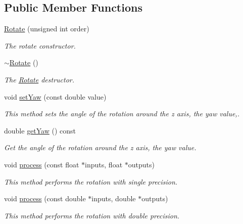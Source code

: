 \subsection*{Public Member Functions}
\begin{DoxyCompactItemize}
\item 
\hyperlink{class_hoa2_d_1_1_rotate_a2aa145bb455c0538ce2ca2bd058d8800}{Rotate} (unsigned int order)
\begin{DoxyCompactList}\small\item\em The rotate constructor. \end{DoxyCompactList}\item 
\hyperlink{class_hoa2_d_1_1_rotate_a7e70e8d9099c1b8a2a42313e464130b2}{$\sim$\-Rotate} ()
\begin{DoxyCompactList}\small\item\em The \hyperlink{class_hoa2_d_1_1_rotate}{Rotate} destructor. \end{DoxyCompactList}\item 
void \hyperlink{class_hoa2_d_1_1_rotate_abc51eceaf32e9844d829a816094f6ac5}{set\-Yaw} (const double value)
\begin{DoxyCompactList}\small\item\em This method sets the angle of the rotation around the z axis, the yaw value,. \end{DoxyCompactList}\item 
double \hyperlink{class_hoa2_d_1_1_rotate_a5f40eff256bd5b845d6b4cfc046cd84e}{get\-Yaw} () const 
\begin{DoxyCompactList}\small\item\em Get the angle of the rotation around the z axis, the yaw value. \end{DoxyCompactList}\item 
void \hyperlink{class_hoa2_d_1_1_rotate_a88bfa68435d940b0c4c1ae0c97baeffd}{process} (const float $\ast$inputs, float $\ast$outputs)
\begin{DoxyCompactList}\small\item\em This method performs the rotation with single precision. \end{DoxyCompactList}\item 
void \hyperlink{class_hoa2_d_1_1_rotate_a8d5ecedca52ad2216efe218b5dcbf834}{process} (const double $\ast$inputs, double $\ast$outputs)
\begin{DoxyCompactList}\small\item\em This method performs the rotation with double precision. \end{DoxyCompactList}\end{DoxyCompactItemize}


